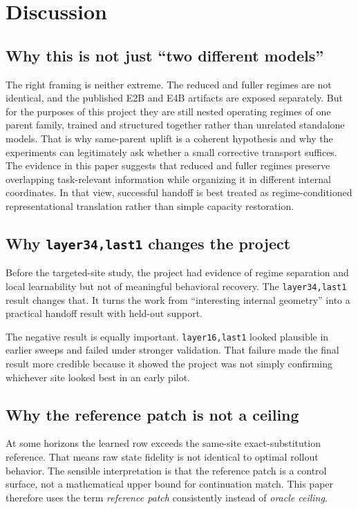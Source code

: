 \documentclass[11pt]{article}
\newcommand{\method}[1]{\texttt{#1}}
\begin{document}
\section{Discussion}
\subsection{Why this is not just ``two different models''}
The right framing is neither extreme. The reduced and fuller regimes are not identical, and the published E2B and E4B artifacts are exposed separately. But for the purposes of this project they are still nested operating regimes of one parent family, trained and structured together rather than unrelated standalone models. That is why same-parent uplift is a coherent hypothesis and why the experiments can legitimately ask whether a small corrective transport suffices.
The evidence in this paper suggests that reduced and fuller regimes preserve overlapping task-relevant information while organizing it in different internal coordinates. In that view, successful handoff is best treated as regime-conditioned representational translation rather than simple capacity restoration.

\subsection{Why \method{layer34,last1} changes the project}
Before the targeted-site study, the project had evidence of regime separation and local learnability but not of meaningful behavioral recovery. The \method{layer34,last1} result changes that. It turns the work from ``interesting internal geometry'' into a practical handoff result with held-out support.

The negative result is equally important. \method{layer16,last1} looked plausible in earlier sweeps and failed under stronger validation. That failure made the final result more credible because it showed the project was not simply confirming whichever site looked best in an early pilot.

\subsection{Why the reference patch is not a ceiling}
At some horizons the learned row exceeds the same-site exact-substitution reference. That means raw state fidelity is not identical to optimal rollout behavior. The sensible interpretation is that the reference patch is a control surface, not a mathematical upper bound for continuation match. This paper therefore uses the term \emph{reference patch} consistently instead of \emph{oracle ceiling}.
\end{document}
